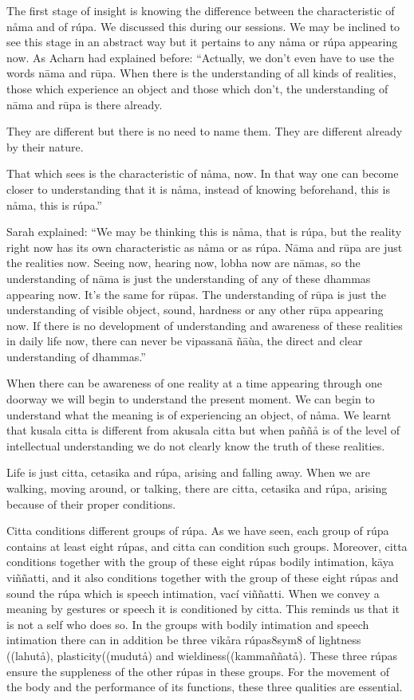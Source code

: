\documentclass[10pt,a4paper,final]{article}
\begin{document}
The first stage of insight is knowing the
difference between the characteristic of nåma and of rúpa. We discussed
this during our sessions. We may be inclined to see this stage in an
abstract way but it pertains to any nåma or rúpa appearing now. As
Acharn had explained before: ``Actually,
we don't even have to use the words
nāma and
rūpa. When there is the
understanding of all kinds
of realities, those which experience an object and those which don't,
the understanding of nāma and
rūpa is there already.

They are
different but there is no
need to name them. They are different already by their nature. 

That which sees is the
characteristic of nåma, now.
In that way one can become closer to understanding that it is
nåma, instead of knowing
beforehand, this is nåma,
this is rúpa.''

Sarah explained:
``We may be thinking this is
nåma, that is
rúpa, but the reality right
now has its own characteristic as
nåma or as
rúpa.
Nāma and
rūpa are just the realities now.
Seeing now, hearing now, lobha now are
nāmas, so the understanding of
nāma is just the understanding of
any of these dhammas
appearing now. It's the same for
rūpas. The understanding of
rūpa is just the understanding of
visible object, sound, hardness or any other
rūpa appearing now.
If there is no development of
understanding and awareness of these realities in daily life now, there
can never be vipassanā
ñāùa, the direct and
clear understanding of dhammas.''

When there can be
awareness of one reality at a time appearing through one doorway we will
begin to understand the present moment. We can begin to
understand what the meaning is of experiencing an object, of nåma. We
learnt that kusala citta is different from akusala citta but when paññå
is of the level of intellectual understanding we do not clearly know the
truth of these realities. 

Life is just citta, cetasika and rúpa,
arising and falling away. When we are walking, moving around, or
talking, there are citta, cetasika and rúpa, arising because of their
proper conditions. 

Citta conditions different groups of rúpa.
As we have seen, each group of rúpa contains at least eight rúpas, and
citta can condition such groups. Moreover, citta conditions together
with the group of these eight rúpas bodily intimation, kāya
viññatti, and it also conditions
together with the group of these eight
rúpas and sound the rúpa which is speech
intimation, vací viññatti. When we convey a meaning by gestures or
speech it is conditioned by citta. This reminds us that it is not a self
who does so. In the groups with bodily intimation and speech intimation
there can in addition be three vikåra
rúpas\protect\hyperlinksdfootnote8sym8 of
lightness ((lahutå),
plasticity((mudutå) and
wieldiness((kammaññatå). These three rúpas
ensure the suppleness of the other rúpas in these groups.
For the movement of the body and the
performance of its functions, these three qualities are essential.
\end{document}
